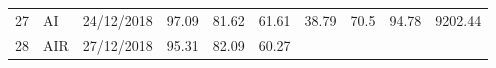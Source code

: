 \documentclass[
  11pt,
]{article}
\begin{document}
\begin{longtable}[]{@{}llllllllll@{}}
\begin{minipage}[t]{0.04\columnwidth}\raggedright
27\strut
\end{minipage} & \begin{minipage}[t]{0.09\columnwidth}\raggedright
AI\strut
\end{minipage} & \begin{minipage}[t]{0.10\columnwidth}\raggedright
24/12/2018\strut
\end{minipage} & \begin{minipage}[t]{0.06\columnwidth}\raggedright
97.09\strut
\end{minipage} & \begin{minipage}[t]{0.06\columnwidth}\raggedright
81.62\strut
\end{minipage} & \begin{minipage}[t]{0.06\columnwidth}\raggedright
61.61\strut
\end{minipage} & \begin{minipage}[t]{0.06\columnwidth}\raggedright
38.79\strut
\end{minipage} & \begin{minipage}[t]{0.06\columnwidth}\raggedright
70.5\strut
\end{minipage} & \begin{minipage}[t]{0.13\columnwidth}\raggedright
94.78\strut
\end{minipage} & \begin{minipage}[t]{0.08\columnwidth}\raggedright
9202.44\strut
\end{minipage}\tabularnewline
\begin{minipage}[t]{0.04\columnwidth}\raggedright
28\strut
\end{minipage} & \begin{minipage}[t]{0.09\columnwidth}\raggedright
AIR\strut
\end{minipage} & \begin{minipage}[t]{0.10\columnwidth}\raggedright
27/12/2018\strut
\end{minipage} & \begin{minipage}[t]{0.06\columnwidth}\raggedright
95.31\strut
\end{minipage} & \begin{minipage}[t]{0.06\columnwidth}\raggedright
82.09\strut
\end{minipage} & \begin{minipage}[t]{0.06\columnwidth}\raggedright
60.27\strut
\end{minipage} & \begin{minipage}[t]{0.06\columnwidth}\raggedright

\end{minipage}
\end{longtable}
\end{document}

